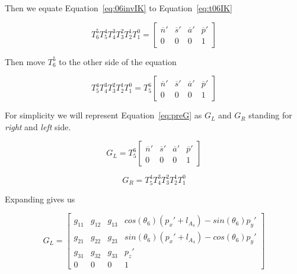 Then we equate Equation~\ref{eq:06invIK} to Equation~\ref{eq:t06IK} 

\begin{equation}
T_{6}^{5}T_{5}^{4}T_{4}^{3}T_{3}^{2}T_{2}^{1}T_{1}^{0} = \left[ \begin{array}{cccc} 
\overline{n}' & \overline{s}' & \overline{a}' & \overline{p}' \\
0             & 0             & 0             & 1   
\end{array} \right]
\end{equation}

Then move $T_6^5$ to the other side of the equation


\begin{equation}\label{eq:preG}
T_{5}^{4}T_{4}^{3}T_{3}^{2}T_{2}^{1}T_{1}^{0} = T_{5}^{6}\left[ \begin{array}{cccc} 
\overline{n}' & \overline{s}' & \overline{a}' & \overline{p}' \\
0             & 0             & 0             & 1   
\end{array} \right]
\end{equation}

For simplicity we will represent Equation~\ref{eq:preG} as $G_L$ and $G_R$ standing for \textit{right} and \textit{left} side.

\begin{equation}
G_L = T_{5}^{6}\left[ \begin{array}{cccc} 
\overline{n}' & \overline{s}' & \overline{a}' & \overline{p}' \\
0             & 0             & 0             & 1   
\end{array} \right]
\end{equation}



\begin{equation}
G_R = T_{5}^{4}T_{4}^{3}T_{3}^{2}T_{2}^{1}T_{1}^{0} 
\end{equation}


Expanding gives us

\begin{equation}
G_L = \left[ \begin{array}{cccc} 
g_{11} & g_{12} & g_{13} & cos(\theta_6)(p_x'+l_{A_4})-sin(\theta_6)p_y' \\
g_{21} & g_{22} & g_{23} & sin(\theta_6)(p_x'+l_{A_4})-cos(\theta_6)p_y' \\
g_{31} & g_{32} & g_{33} & p_z'                                         \\
0      & 0      & 0      & 1   
\end{array} \right]
\end{equation}

